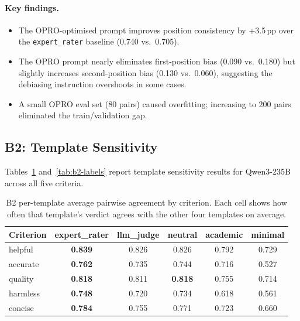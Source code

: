 \documentclass[11pt,a4paper]{article}
\begin{document}
\paragraph{Key findings.}
\begin{itemize}[nosep]
  \item The OPRO-optimised prompt improves position consistency by +3.5\,pp
        over the \texttt{expert\_rater} baseline (0.740 vs.\ 0.705).
  \item The OPRO prompt nearly eliminates first-position bias (0.090 vs.\ 0.180)
        but slightly increases second-position bias (0.130 vs.\ 0.060), suggesting
        the debiasing instruction overshoots in some cases.
  \item A small OPRO eval set (80 pairs) caused overfitting; increasing to 200
        pairs eliminated the train/validation gap.
\end{itemize}


\subsection{B2: Template Sensitivity}\label{sec:b2-results}

Tables~\ref{tab:b2-per-template} and~\ref{tab:b2-labels} report template
sensitivity results for Qwen3-235B across all five criteria.

\begin{table}[htbp]
\centering
\small
\caption{B2 per-template average pairwise agreement by criterion. Each cell
shows how often that template's verdict agrees with the other four templates
on average.}
\label{tab:b2-per-template}
\begin{tabular}{@{}lccccc@{}}
  \toprule
  \textbf{Criterion} & \textbf{expert\_rater} & \textbf{llm\_judge}
    & \textbf{neutral} & \textbf{academic} & \textbf{minimal} \\
  \midrule
  helpful  & \textbf{0.839} & 0.826 & 0.826 & 0.792 & 0.729 \\
  accurate & \textbf{0.762} & 0.735 & 0.744 & 0.716 & 0.527 \\
  quality  & \textbf{0.818} & 0.811 & \textbf{0.818} & 0.755 & 0.714 \\
  harmless & \textbf{0.748} & 0.720 & 0.734 & 0.618 & 0.561 \\
  concise  & \textbf{0.784} & 0.755 & 0.771 & 0.723 & 0.660 \\
  \bottomrule
\end{tabular}
\end{table}
\end{document}
